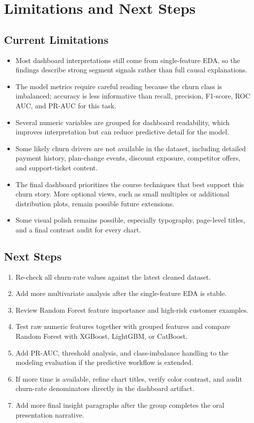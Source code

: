 \section{Limitations and Next Steps}

\subsection{Current Limitations}
\begin{itemize}
  \item Most dashboard interpretations still come from single-feature EDA, so
  the findings describe strong segment signals rather than full causal
  explanations.
  \item The model metrics require careful reading because the churn class is
  imbalanced; accuracy is less informative than recall, precision, F1-score,
  ROC AUC, and PR-AUC for this task.
  \item Several numeric variables are grouped for dashboard readability, which
  improves interpretation but can reduce predictive detail for the model.
  \item Some likely churn drivers are not available in the dataset, including
  detailed payment history, plan-change events, discount exposure, competitor
  offers, and support-ticket content.
  \item The final dashboard prioritizes the course techniques that best support
  this churn story. More optional views, such as small multiples or additional
  distribution plots, remain possible future extensions.
  \item Some visual polish remains possible, especially typography, page-level
  titles, and a final contrast audit for every chart.
\end{itemize}

\subsection{Next Steps}
\begin{enumerate}
  \item Re-check all churn-rate values against the latest cleaned dataset.
  \item Add more multivariate analysis after the single-feature EDA is stable.
  \item Review Random Forest feature importance and high-risk customer examples.
  \item Test raw numeric features together with grouped features and compare
  Random Forest with XGBoost, LightGBM, or CatBoost.
  \item Add PR-AUC, threshold analysis, and class-imbalance handling to the
  modeling evaluation if the predictive workflow is extended.
  \item If more time is available, refine chart titles, verify color contrast,
  and audit churn-rate denominators directly in the dashboard artifact.
  \item Add more final insight paragraphs after the group completes the oral
  presentation narrative.
\end{enumerate}

